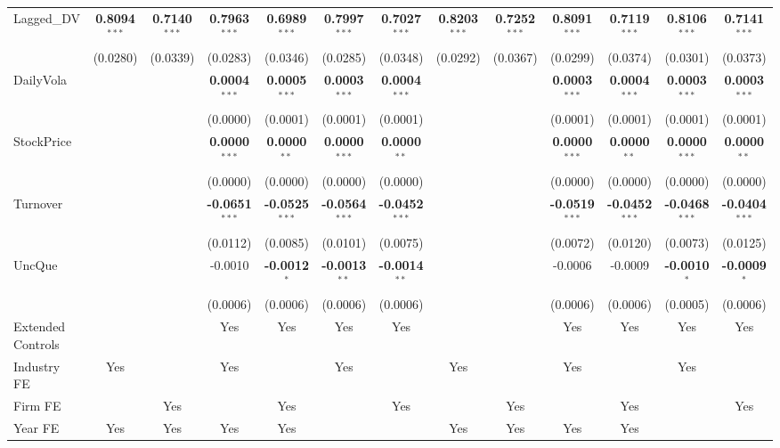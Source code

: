 \begin{landscape}
\begin{table}[H]
\begin{tabular}{lcccccccccccc}
Lagged\_DV & \textbf{0.8094}$^{***}$ & \textbf{0.7140}$^{***}$ & \textbf{0.7963}$^{***}$ & \textbf{0.6989}$^{***}$ & \textbf{0.7997}$^{***}$ & \textbf{0.7027}$^{***}$ & \textbf{0.8203}$^{***}$ & \textbf{0.7252}$^{***}$ & \textbf{0.8091}$^{***}$ & \textbf{0.7119}$^{***}$ & \textbf{0.8106}$^{***}$ & \textbf{0.7141}$^{***}$ \\
 & (0.0280) & (0.0339) & (0.0283) & (0.0346) & (0.0285) & (0.0348) & (0.0292) & (0.0367) & (0.0299) & (0.0374) & (0.0301) & (0.0373) \\
DailyVola &  &  & \textbf{0.0004}$^{***}$ & \textbf{0.0005}$^{***}$ & \textbf{0.0003}$^{***}$ & \textbf{0.0004}$^{***}$ &  &  & \textbf{0.0003}$^{***}$ & \textbf{0.0004}$^{***}$ & \textbf{0.0003}$^{***}$ & \textbf{0.0003}$^{***}$ \\
 &  &  & (0.0000) & (0.0001) & (0.0001) & (0.0001) &  &  & (0.0001) & (0.0001) & (0.0001) & (0.0001) \\
StockPrice &  &  & \textbf{0.0000}$^{***}$ & \textbf{0.0000}$^{**}$ & \textbf{0.0000}$^{***}$ & \textbf{0.0000}$^{**}$ &  &  & \textbf{0.0000}$^{***}$ & \textbf{0.0000}$^{**}$ & \textbf{0.0000}$^{***}$ & \textbf{0.0000}$^{**}$ \\
 &  &  & (0.0000) & (0.0000) & (0.0000) & (0.0000) &  &  & (0.0000) & (0.0000) & (0.0000) & (0.0000) \\
Turnover &  &  & \textbf{-0.0651}$^{***}$ & \textbf{-0.0525}$^{***}$ & \textbf{-0.0564}$^{***}$ & \textbf{-0.0452}$^{***}$ &  &  & \textbf{-0.0519}$^{***}$ & \textbf{-0.0452}$^{***}$ & \textbf{-0.0468}$^{***}$ & \textbf{-0.0404}$^{***}$ \\
 &  &  & (0.0112) & (0.0085) & (0.0101) & (0.0075) &  &  & (0.0072) & (0.0120) & (0.0073) & (0.0125) \\
UncQue &  &  & -0.0010 & \textbf{-0.0012}$^{*}$ & \textbf{-0.0013}$^{**}$ & \textbf{-0.0014}$^{**}$ &  &  & -0.0006 & -0.0009 & \textbf{-0.0010}$^{*}$ & \textbf{-0.0009}$^{*}$ \\
 &  &  & (0.0006) & (0.0006) & (0.0006) & (0.0006) &  &  & (0.0006) & (0.0006) & (0.0005) & (0.0006) \\
\midrule
Extended Controls &  &  & Yes & Yes & Yes & Yes &  &  & Yes & Yes & Yes & Yes \\
Industry FE & Yes &  & Yes &  & Yes &  & Yes &  & Yes &  & Yes &  \\
Firm FE &  & Yes &  & Yes &  & Yes &  & Yes &  & Yes &  & Yes \\
Year FE & Yes & Yes & Yes & Yes &  &  & Yes & Yes & Yes & Yes &  &  \\

\end{tabular}
\end{table}
\end{landscape}
